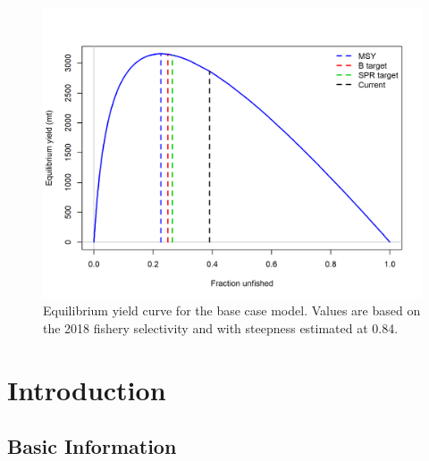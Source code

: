 \documentclass[12pt,]{article}
\begin{document}
\begin{figure}
\centering
\includegraphics{r4ss/plots_mod1/yield2_yield_curve_with_refpoints.png}
\caption{Equilibrium yield curve for the base case model. Values are
based on the 2018 fishery selectivity and with steepness estimated at
0.84. \label{fig:Yield_all}}
\end{figure}

\FloatBarrier

\newpage

\renewcommand{\thefigure}{\arabic{figure}}
\renewcommand{\thetable}{\arabic{table}}

\setcounter{figure}{0} \setcounter{table}{0}


\section{Introduction}\label{introduction}

\subsection{Basic Information}\label{basic-information}
\end{document}
